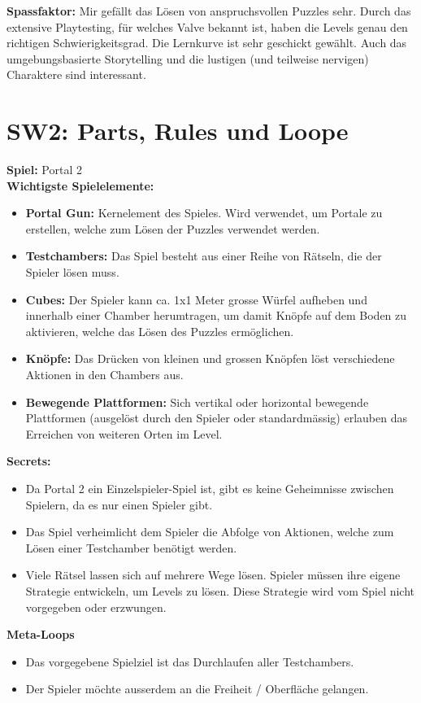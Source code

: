 \documentclass{article}
\begin{document}
\bigskip
\textbf{Spassfaktor:} Mir gefällt das Lösen von anspruchsvollen Puzzles sehr. Durch das extensive Playtesting, für welches Valve
bekannt ist, haben die Levels genau den richtigen Schwierigkeitsgrad. Die Lernkurve ist sehr geschickt gewählt.
Auch das umgebungsbasierte Storytelling und die lustigen (und teilweise nervigen) Charaktere sind interessant.

\section{SW2: Parts, Rules und Loope}

\textbf{Spiel:} Portal 2
\\
\textbf{Wichtigste Spielelemente:}
\begin{itemize}
    \item \textbf{Portal Gun:} Kernelement des Spieles. Wird verwendet, um Portale zu erstellen, welche zum Lösen der Puzzles
    verwendet werden.
    \item \textbf{Testchambers:} Das Spiel besteht aus einer Reihe von Rätseln, die der Spieler lösen muss.
    \item \textbf{Cubes:} Der Spieler kann ca. 1x1 Meter grosse Würfel aufheben und innerhalb einer Chamber herumtragen, um damit
    Knöpfe auf dem Boden zu aktivieren, welche das Lösen des Puzzles ermöglichen.
    \item \textbf{Knöpfe:} Das Drücken von kleinen und grossen Knöpfen löst verschiedene Aktionen in den Chambers aus.
    \item \textbf{Bewegende Plattformen:} Sich vertikal oder horizontal bewegende Plattformen
    (ausgelöst durch den Spieler oder standardmässig) erlauben das Erreichen von weiteren Orten im Level.
\end{itemize}
\bigskip
\textbf{Secrets:}
\begin{itemize}
    \item Da Portal 2 ein Einzelspieler-Spiel ist, gibt es keine Geheimnisse zwischen Spielern, da es nur einen Spieler gibt.
    \item Das Spiel verheimlicht dem Spieler die Abfolge von Aktionen, welche zum Lösen einer Testchamber benötigt werden.
    \item Viele Rätsel lassen sich auf mehrere Wege lösen. Spieler müssen ihre eigene Strategie entwickeln, um Levels zu lösen.
    Diese Strategie wird vom Spiel nicht vorgegeben oder erzwungen.
\end{itemize}
\bigskip
\textbf{Meta-Loops}
\begin{itemize}
    \item Das vorgegebene Spielziel ist das Durchlaufen aller Testchambers.
    \item Der Spieler möchte ausserdem an die Freiheit / Oberfläche gelangen.
\end{itemize}
\end{document}
